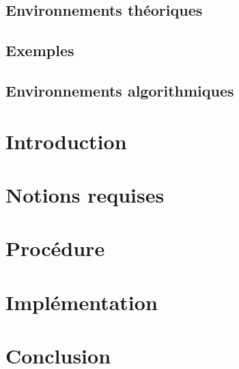 

\newcommand{\student}{Benjamin André}
\newcommand{\grade}{MAB2 Sciences Informatiques}
\newcommand{\director}{Véronique Bruyère}
\renewcommand{\title}{Vérification de la sécurité d'automates à file par apprentissage actif}
\renewcommand{\date}{\today}



	

	\tableofcontents
	\newpage

	\section*{Environnements théoriques}

	\section*{Exemples}

	\section*{Environnements algorithmiques}

	\newpage


	\chapter{Introduction}\label{intro}
	\chapter{Notions requises}\label{pre}
	\chapter{Procédure}\label{pro}
	\chapter{Implémentation}\label{impl}%
	\chapter{Conclusion}\label{ccl}%

